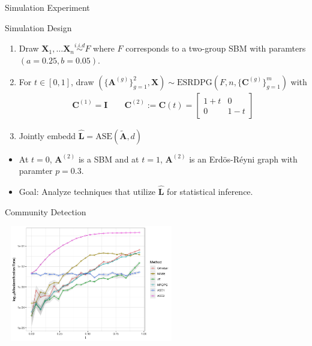 \documentclass[handout]{beamer}
\newcommand{\bvar}[1]{\mathbf{#1}}
\begin{document}
\begin{frame}{Simulation Experiment}

    \begin{block}{Simulation Design}
        \begin{enumerate}
            \item Draw $\bvar{X}_1, \ldots \bvar{X}_n \overset{i.i.d}{\sim} F$ where $F$ corresponds to a two-group SBM with paramters $(a = 0.25, b = 0.05)$. 
            \item For $t\in[0,1]$, draw $(\{\bvar{A}^{(g)}\}_{g=1}^2, \bvar{X})\sim \text{ESRDPG}(F, n, \{\bvar{C}^{(g)}\}_{g=1}^m)$ with 
               \begin{align*}
                    \bvar{C}^{(1)} = \bvar{I} \quad \quad \bvar{C}^{(2)} := \bvar{C}(t) = \begin{bmatrix} 1 + t & 0\\ 0 & 1 - t \end{bmatrix}
                \end{align*}
            \item Jointly embedd $\hat{\bvar{L}} = \text{ASE}(\tilde{\bvar{A}}, d)$
        \end{enumerate}
    \end{block}
 \begin{itemize}
    \item At $t = 0$, $\bvar{A}^{(2)}$ is a SBM and at $t = 1$, $\bvar{A}^{(2)}$ is an Erd\"{o}s-R\'{e}yni graph with paramter $p = 0.3$.\pause
    \item Goal: Analyze techniques that utilize $\hat{\bvar{L}}$ for statistical inference. 
 \end{itemize}   
\end{frame}

\begin{frame}{Community Detection}
    \begin{center}
        \includegraphics[width = 3in, height = 2in]{multiple_methods_mc_comp.jpeg}
    \end{center}
\end{frame}
\end{document}

